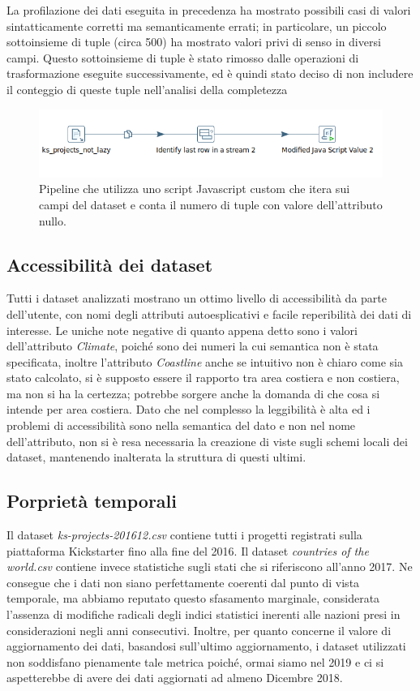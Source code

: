 La profilazione dei dati eseguita in precedenza ha mostrato possibili casi di valori sintatticamente corretti ma semanticamente errati; in particolare, un piccolo sottoinsieme di tuple (circa 500) ha mostrato valori privi di senso in diversi campi. Questo sottoinsieme di tuple è stato rimosso dalle operazioni di trasformazione eseguite successivamente, ed è quindi stato deciso di non includere il conteggio di queste tuple nell'analisi della completezza

\begin{figure}
	\centering
	\includegraphics[width=0.7\linewidth]{images/DQ_completezza}
	\caption{Pipeline che utilizza uno script Javascript custom che itera sui campi del dataset e conta il numero di tuple con valore dell'attributo nullo.}
	\label{fig:dqcompletezza}
\end{figure}

\subsection{Accessibilità dei dataset}
Tutti i dataset analizzati mostrano un ottimo livello di accessibilità da parte dell'utente, con nomi degli attributi autoesplicativi e facile reperibilità dei dati di interesse. 
Le uniche note negative di quanto appena detto sono i valori dell'attributo \textit{Climate}, poiché sono dei numeri la cui semantica non è stata specificata, inoltre l'attributo \textit{Coastline} anche se intuitivo non è chiaro come sia stato calcolato, si è supposto essere il rapporto tra area costiera e non costiera, ma non si ha la certezza; potrebbe sorgere anche la domanda di che cosa si intende per area costiera.
Dato che nel complesso la leggibilità è alta ed i problemi di accessibilità sono nella semantica del dato e non nel nome dell'attributo, non si è resa necessaria la creazione di viste sugli schemi locali dei dataset, mantenendo inalterata la struttura di questi ultimi.

\subsection{Porprietà temporali}
\label{subsec:temporali}
Il dataset \textit{ks-projects-201612.csv} contiene tutti i progetti registrati sulla piattaforma Kickstarter fino alla fine del 2016. Il dataset \textit{countries of the world.csv} contiene invece statistiche sugli stati che si riferiscono all'anno 2017. Ne consegue che i dati non siano perfettamente coerenti dal punto di vista temporale, ma abbiamo reputato questo sfasamento marginale, considerata l'assenza di modifiche radicali degli indici statistici inerenti alle nazioni presi in considerazioni negli anni consecutivi.
Inoltre, per quanto concerne il valore di aggiornamento dei dati, basandosi sull'ultimo aggiornamento, i dataset utilizzati non soddisfano pienamente tale metrica poiché, ormai siamo nel 2019 e ci si aspetterebbe di avere dei dati aggiornati ad almeno Dicembre 2018.


